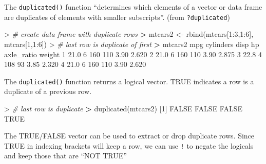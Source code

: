\documentclass[
]{book}
\newenvironment{Shaded}{\begin{snugshade}}{\end{snugshade}}
\newcommand{\CommentTok}[1]{\textcolor[rgb]{0.56,0.35,0.01}{\textit{#1}}}
\newcommand{\ConstantTok}[1]{\textcolor[rgb]{0.00,0.00,0.00}{#1}}
\newcommand{\DecValTok}[1]{\textcolor[rgb]{0.00,0.00,0.81}{#1}}
\newcommand{\ErrorTok}[1]{\textcolor[rgb]{0.64,0.00,0.00}{\textbf{#1}}}
\newcommand{\FloatTok}[1]{\textcolor[rgb]{0.00,0.00,0.81}{#1}}
\newcommand{\FunctionTok}[1]{\textcolor[rgb]{0.00,0.00,0.00}{#1}}
\newcommand{\NormalTok}[1]{#1}
\newcommand{\OtherTok}[1]{\textcolor[rgb]{0.56,0.35,0.01}{#1}}
\newcommand{\SpecialCharTok}[1]{\textcolor[rgb]{0.00,0.00,0.00}{#1}}
\begin{document}
The \texttt{duplicated()} function ``determines which elements of a vector or data frame are duplicates of elements with smaller subscripts''. (from \texttt{?duplicated})

\begin{Shaded}
\begin{Highlighting}[]
\SpecialCharTok{\textgreater{}} \CommentTok{\# create data frame with duplicate rows}
\ErrorTok{\textgreater{}}\NormalTok{ mtcars2 }\OtherTok{\textless{}{-}} \FunctionTok{rbind}\NormalTok{(mtcars[}\DecValTok{1}\SpecialCharTok{:}\DecValTok{3}\NormalTok{,}\DecValTok{1}\SpecialCharTok{:}\DecValTok{6}\NormalTok{], mtcars[}\DecValTok{1}\NormalTok{,}\DecValTok{1}\SpecialCharTok{:}\DecValTok{6}\NormalTok{])}
\SpecialCharTok{\textgreater{}} \CommentTok{\# last row is duplicate of first}
\ErrorTok{\textgreater{}}\NormalTok{ mtcars2}
\NormalTok{   mpg cylinders disp  hp axle\_ratio weight}
\DecValTok{1} \FloatTok{21.0}         \DecValTok{6}  \DecValTok{160} \DecValTok{110}       \FloatTok{3.90}  \FloatTok{2.620}
\DecValTok{2} \FloatTok{21.0}         \DecValTok{6}  \DecValTok{160} \DecValTok{110}       \FloatTok{3.90}  \FloatTok{2.875}
\DecValTok{3} \FloatTok{22.8}         \DecValTok{4}  \DecValTok{108}  \DecValTok{93}       \FloatTok{3.85}  \FloatTok{2.320}
\DecValTok{4} \FloatTok{21.0}         \DecValTok{6}  \DecValTok{160} \DecValTok{110}       \FloatTok{3.90}  \FloatTok{2.620}
\end{Highlighting}
\end{Shaded}

The \texttt{duplicated()} function returns a logical vector. TRUE indicates a row is a duplicate of a previous row.

\begin{Shaded}
\begin{Highlighting}[]
\SpecialCharTok{\textgreater{}} \CommentTok{\# last row is duplicate}
\ErrorTok{\textgreater{}} \FunctionTok{duplicated}\NormalTok{(mtcars2)}
\NormalTok{[}\DecValTok{1}\NormalTok{] }\ConstantTok{FALSE} \ConstantTok{FALSE} \ConstantTok{FALSE}  \ConstantTok{TRUE}
\end{Highlighting}
\end{Shaded}

The TRUE/FALSE vector can be used to extract or drop duplicate rows. Since TRUE in indexing brackets will keep a row, we can use \texttt{!} to negate the logicals and keep those that are ``NOT TRUE''
\end{document}
